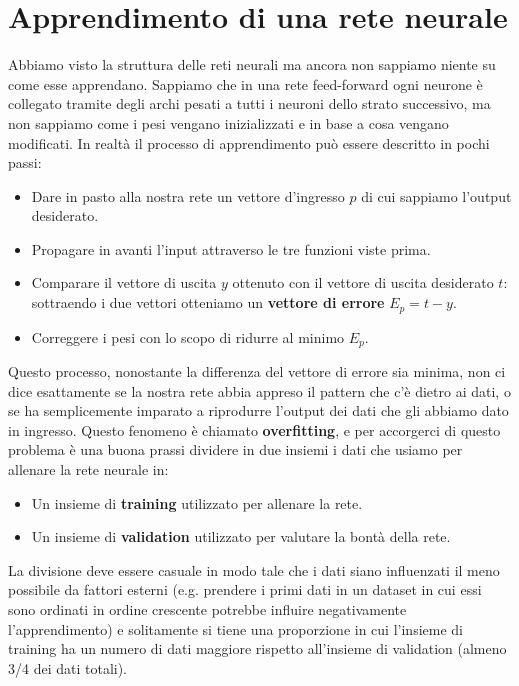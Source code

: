 \documentclass[12pt, twoside, letterpaper]{report}
\begin{document}
		\section{Apprendimento di una rete neurale}
			Abbiamo visto la struttura delle reti neurali ma ancora non sappiamo niente su come esse apprendano. Sappiamo che in una rete feed-forward ogni neurone è collegato tramite degli archi pesati a tutti i neuroni dello strato successivo, ma non sappiamo come i pesi vengano inizializzati e in base a cosa vengano modificati. In realtà il processo di apprendimento può essere descritto in pochi passi: 
			\begin{itemize}
				\item Dare in pasto alla nostra rete un vettore d'ingresso $p$ di cui sappiamo l'output desiderato. %
				\item Propagare in avanti l'input attraverso le tre funzioni viste prima.
				\item Comparare il vettore di uscita $y$ ottenuto con il vettore di uscita desiderato $t$: sottraendo i due vettori otteniamo un \textbf{vettore di errore} $E_p = t - y$. %
				\item Correggere i pesi con lo scopo di ridurre al minimo $E_p$. %
			\end{itemize} %
			Questo processo, nonostante la differenza del vettore di errore sia minima, non ci dice esattamente se la nostra rete abbia appreso il pattern che c'è dietro ai dati, o se ha semplicemente imparato a riprodurre l'output dei dati che gli abbiamo dato in ingresso. Questo fenomeno è chiamato \textbf{overfitting}, e per accorgerci di questo problema è una buona prassi dividere in due insiemi i dati che usiamo per allenare la rete neurale in: %
			\begin{itemize}
				\item Un insieme di \textbf{training} utilizzato per allenare la rete.
				\item Un insieme di \textbf{validation} utilizzato per valutare la bontà della rete.%
			\end{itemize}
			La divisione deve essere casuale in modo tale che i dati siano influenzati il meno possibile da fattori esterni (e.g. prendere i primi dati in un dataset in cui essi sono ordinati in ordine crescente potrebbe influire negativamente l'apprendimento) e solitamente si tiene una proporzione in cui l'insieme di training ha un numero di dati maggiore rispetto all'insieme di validation (almeno 3/4 dei dati totali). 
\end{document}
